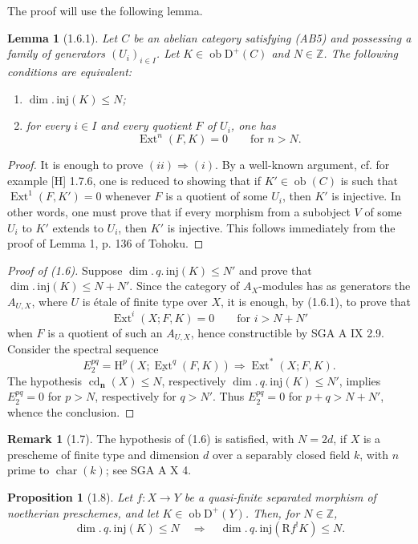 \documentclass[11pt,a4paper]{article}
\newcommand{\Z}{\mathbb{Z}}
\newcommand{\D}{\mathrm{D}}
\newcommand{\ob}{\operatorname{ob}}
\DeclareMathOperator{\Ext}{Ext}
\DeclareMathOperator{\cd}{cd}
\DeclareMathOperator{\car}{char}
\newcommand{\uExt}{\underline{\Ext}}
\newcommand{\qinjdim}{\dim.\,q.\,\mathrm{inj}}
\newcommand{\injdim}{\dim.\,\mathrm{inj}}
\theoremstyle{plain}
\newtheorem*{propositionstar}{Proposition}
\newtheorem*{lemmastar}{Lemma}
\theoremstyle{definition}
\newtheorem*{remarkstar}{Remark}
\begin{document}
The proof will use the following lemma.

\begin{lemmastar}[1.6.1]
Let $C$ be an abelian category satisfying (AB5) and possessing a family of generators $(U_i)_{i\in I}$. Let $K\in\ob\D^+(C)$ and $N\in\Z$. The following conditions are equivalent:
\begin{enumerate}[label=(\roman*)]
\item $\injdim(K)\leq N$;
\item for every $i\in I$ and every quotient $F$ of $U_i$, one has
\[
\Ext^n(F,K)=0\qquad\text{for }n>N.
\]
\end{enumerate}
\end{lemmastar}

\begin{proof}
It is enough to prove $(ii)\Rightarrow(i)$. By a well-known argument, cf. for example [H] 1.7.6, one is reduced to showing that if $K'\in\ob(C)$ is such that $\Ext^1(F,K')=0$ whenever $F$ is a quotient of some $U_i$, then $K'$ is injective. In other words, one must prove that if every morphism from a subobject $V$ of some $U_i$ to $K'$ extends to $U_i$, then $K'$ is injective. This follows immediately from the proof of Lemma 1, p. 136 of Tohoku.
\end{proof}

\begin{proof}[Proof of (1.6)]
Suppose $\qinjdim(K)\leq N'$ and prove that $\injdim(K)\leq N+N'$. Since the category of $A_X$-modules has as generators the $A_{U,X}$, where $U$ is étale of finite type over $X$, it is enough, by (1.6.1), to prove that
\[
\Ext^i(X;F,K)=0\qquad\text{for }i>N+N'
\]
when $F$ is a quotient of such an $A_{U,X}$, hence constructible by SGA A IX 2.9. Consider the spectral sequence
\[
E_2^{pq}=\mathrm H^p(X;\uExt^q(F,K))\Rightarrow \Ext^*(X;F,K).
\]
The hypothesis $\cd_{\mathbf n}(X)\leq N$, respectively $\qinjdim(K)\leq N'$, implies $E_2^{pq}=0$ for $p>N$, respectively for $q>N'$. Thus $E_2^{pq}=0$ for $p+q>N+N'$, whence the conclusion.
\end{proof}

\begin{remarkstar}[1.7]
The hypothesis of (1.6) is satisfied, with $N=2d$, if $X$ is a prescheme of finite type and dimension $d$ over a separably closed field $k$, with $n$ prime to $\car(k)$; see SGA A X 4.
\end{remarkstar}

\begin{propositionstar}[1.8]
Let $f:X\to Y$ be a quasi-finite separated morphism of noetherian preschemes, and let $K\in\ob\D^+(Y)$. Then, for $N\in\Z$,
\[
\qinjdim(K)\leq N\quad\Longrightarrow\quad \qinjdim(\mathrm{R}f^!K)\leq N.
\]
\end{propositionstar}
\end{document}
